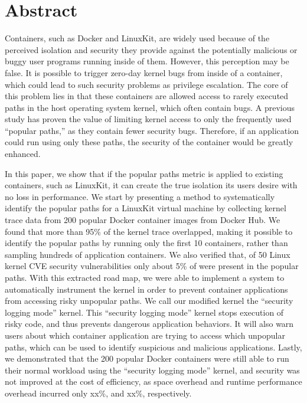 \section*{Abstract}
Containers, such as Docker and LinuxKit, are widely used because of the perceived isolation and security they provide 
against the potentially malicious or buggy user programs running inside of them. However, this perception may be false. 
It is possible to trigger zero-day kernel bugs from inside of a container, which could lead to such security problems as privilege escalation. 
The core of this problem lies in that these containers are allowed access to rarely executed paths in the host operating system kernel, 
which often contain bugs. A previous study \cite{Lock-in-Pop} has proven the value of limiting kernel access to 
only the frequently used ``popular paths,'' as they contain fewer security bugs. 
Therefore, if an application could run using only these paths, the security of the container would be greatly enhanced. 

In this paper, we show that if the popular paths metric is applied to existing containers, such as LinuxKit, 
it can create the true isolation its users desire with no loss in performance. 
We start by presenting a method to systematically identify the popular paths for a LinuxKit virtual machine 
by collecting kernel trace data from 200 popular Docker container images from Docker Hub. 
We found that more than 95\% of the kernel trace overlapped, making it possible to identify the popular paths by running 
only the first 10 containers, rather than sampling hundreds of application containers. 
We also verified that, of 50 Linux kernel CVE security vulnerabilities only about 5\% of were present in the popular paths. 
With this extracted road map, we were able to implement a system to automatically instrument the kernel in order to 
prevent container applications from accessing risky unpopular paths. 
We call our modified kernel the ``security logging mode'' kernel. 
This ``security logging mode'' kernel stops execution of risky code, and thus prevents dangerous application behaviors. 
It will also warn users about which container application are trying to access which unpopular paths, 
which can be used to identify suspicious and malicious applications. 
Lastly, we demonstrated that the 200 popular Docker containers were still able to run their normal workload 
using the ``security logging mode'' kernel, and security was not improved at the cost of efficiency, 
as space overhead and runtime performance overhead incurred only xx\%, and xx\%, respectively.  